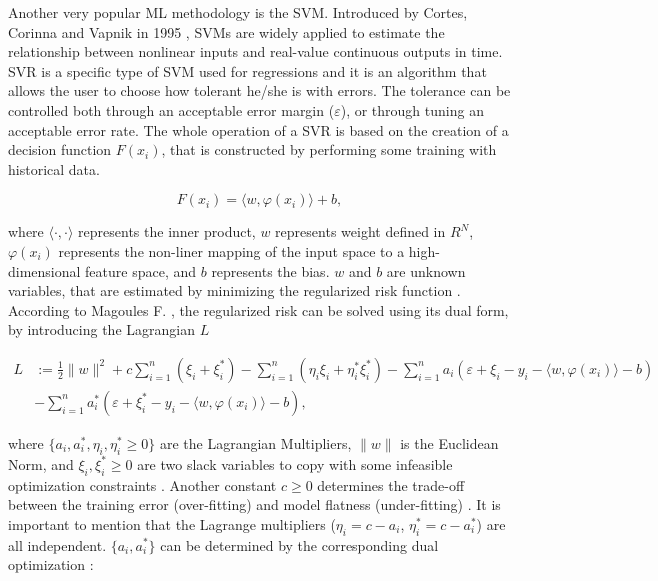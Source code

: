 Another very popular \ac{ML} methodology is the \ac{SVM}. Introduced by Cortes, Corinna and Vapnik in 1995 \cite{svm1}, \ac{SVM}s are widely applied to estimate the relationship between nonlinear inputs and real-value continuous outputs in time. \ac{SVR} is a specific type of \ac{SVM} used for regressions and it is an algorithm that allows the user to choose how tolerant he/she is with errors. The tolerance can be controlled both through an acceptable error margin ($\varepsilon$), or through tuning an acceptable error rate. The whole operation of a \ac{SVR} is based on the creation of a decision function $F(x_i)$, that is constructed by performing some training with historical data.

\begin{equation}
   F(x_i) = \langle w, \varphi(x_i) \rangle + b,
   \label{svmdec}
\end{equation}

where $\langle\cdot,\cdot\rangle$ represents the inner product, $w$ represents weight defined in $R^N$, $\varphi(x_i)$ represents the non-liner mapping of the input space to a high-dimensional feature space, and $b$ represents the bias\cite{svm2}. $w$ and $b$ are unknown variables, that are estimated by minimizing the regularized risk function \cite{svm2}. According to Magoules F. \cite{ann1}, the regularized risk can be solved using its dual form, by introducing the Lagrangian $L$

\begin{equation}
\begin{split}
       L & := \frac{1}{2}\parallel w \parallel^2 + c \sum_{i=1}^{n}(\xi_i + \xi_i^*) - \sum_{i=1}^{n}(\eta_i\xi_i + \eta_i^*\xi_i^*) - \sum_{i=1}^{n}a_i(\varepsilon + \xi_i - y_i- \langle w, \varphi(x_i) \rangle - b) \\ 
         & - \sum_{i=1}^{n}a_i^*(\varepsilon + \xi_i^* - y_i- \langle w, \varphi(x_i) \rangle - b),
\end{split}
\end{equation}

where $\{a_i, a_i^*, \eta_i, \eta_i^*\geq 0\}$ are the Lagrangian Multipliers, $\parallel w \parallel$ is the Euclidean Norm, and ${{\xi_i,\xi_i^*\geq 0}}$ are two slack variables to copy with some infeasible optimization constraints \cite{review2017}. Another constant $c \geq 0$ determines the trade-off between the training error (over-fitting) and model flatness (under-fitting) \cite{review2017}. 
It is important to mention that the Lagrange multipliers ($\eta_i = c - a_i$, $\eta_i^* = c-a_i^*$) are all independent. $\{a_i, a_i^*\}$ can be determined by the corresponding dual optimization \cite{ann1}:

